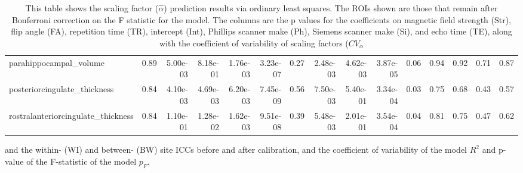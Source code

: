 \begin{table}
\begin{tabular}{lrrrrrrrrrrrrrr}
parahippocampal\_volume             &  0.89 &    5.00e-03 &     8.18e-01 &  1.76e-03 &     3.23e-07 &          0.27 &      2.48e-03 &  4.62e-03 &  3.87e-05 &  0.06 &  0.94 &    0.92 &  0.71 &    0.87 \\
posteriorcingulate\_thickness       &  0.84 &    4.10e-03 &     4.69e-03 &  6.20e-03 &     7.45e-09 &          0.56 &      7.50e-03 &  5.40e-01 &  3.34e-04 &  0.03 &  0.75 &    0.68 &  0.43 &    0.57 \\
rostralanteriorcingulate\_thickness &  0.84 &    1.10e-01 &     1.28e-02 &  1.62e-03 &     9.51e-08 &          0.39 &      5.48e-03 &  2.01e-01 &  3.54e-04 &  0.04 &  0.81 &    0.75 &  0.47 &    0.62 \\
\bottomrule
\end{tabular}
\label{tab:alpha_predict}
\caption{This table shows the scaling factor ($\hat{\alpha}$)  prediction results via ordinary least squares. The ROIs shown are those that remain after Bonferroni correction on the F statistic for the model. The columns are the p values for the coefficients on magnetic field strength (Str), flip angle (FA), repetition time (TR), intercept (Int), Phillips scanner make (Ph), Siemens scanner make (Si), and echo time (TE), along with the coefficient of variability of scaling factors ($CV_\alpha$} and the within- (WI) and between- (BW) site ICCs before and after calibration, and the coefficient of variability of the model $R^2$ and p-value of the F-statistic of the model $p_F$.
\end{table}
